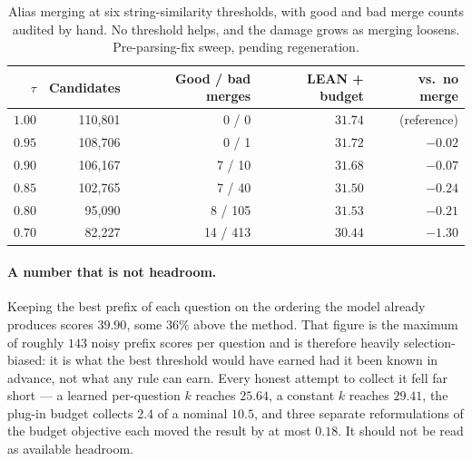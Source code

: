 \documentclass{article}
\begin{document}
\begin{table}
  \caption{Alias merging at six string-similarity thresholds, with good and bad merge counts audited by hand. No threshold helps, and the damage grows as merging loosens. Pre-parsing-fix sweep, pending regeneration.}
  \label{tab:alias}
  \centering
  \begin{tabular}{rrrrr}
    \toprule
    $\tau$ & Candidates & Good / bad merges & LEAN + budget & vs.\ no merge \\
    \midrule
    $1.00$ & 110,801 & 0 / 0     & $31.74$ & (reference) \\
    $0.95$ & 108,706 & 0 / 1     & $31.72$ & $-0.02$ \\
    $0.90$ & 106,167 & 7 / 10    & $31.68$ & $-0.07$ \\
    $0.85$ & 102,765 & 7 / 40    & $31.50$ & $-0.24$ \\
    $0.80$ &  95,090 & 8 / 105   & $31.53$ & $-0.21$ \\
    $0.70$ &  82,227 & 14 / 413  & $30.44$ & $-1.30$ \\
    \bottomrule
  \end{tabular}
\end{table}

\paragraph{A number that is not headroom.}
Keeping the best prefix of each question on the ordering the model already produces scores $39.90$, some $36\%$ above the method. That figure is the maximum of roughly $143$ noisy prefix scores per question and is therefore heavily selection-biased: it is what the best threshold would have earned had it been known in advance, not what any rule can earn. Every honest attempt to collect it fell far short --- a learned per-question $k$ reaches $25.64$, a constant $k$ reaches $29.41$, the plug-in budget collects $2.4$ of a nominal $10.5$, and three separate reformulations of the budget objective each moved the result by at most $0.18$. It should not be read as available headroom.
\end{document}
